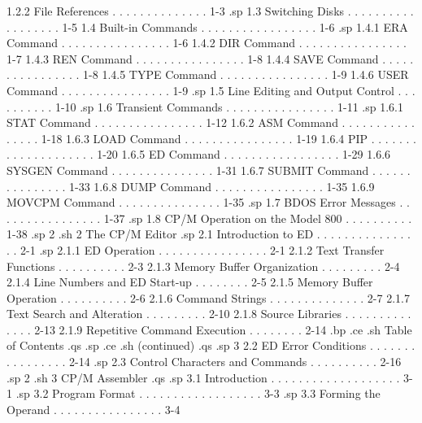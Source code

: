         1.2.2  File References  . . . . . . . . . . . . . .   1-3 
.sp
   1.3  Switching Disks . . . . . . . . . . . . . . . . . .   1-5 
   1.4  Built-in Commands . . . . . . . . . . . . . . . . .   1-6 
.sp
        1.4.1  ERA Command  . . . . . . . . . . . . . . . .   1-6 
        1.4.2  DIR Command  . . . . . . . . . . . . . . . .   1-7 
        1.4.3  REN Command  . . . . . . . . . . . . . . . .   1-8 
        1.4.4  SAVE Command . . . . . . . . . . . . . . . .   1-8 
        1.4.5  TYPE Command . . . . . . . . . . . . . . . .   1-9 
        1.4.6  USER Command . . . . . . . . . . . . . . . .   1-9 
.sp
   1.5  Line Editing and Output Control . . . . . . . . . .  1-10 
.sp
   1.6  Transient Commands  . . . . . . . . . . . . . . . .  1-11 
.sp
        1.6.1  STAT Command . . . . . . . . . . . . . . . .  1-12 
        1.6.2  ASM Command  . . . . . . . . . . . . . . . .  1-18 
        1.6.3  LOAD Command . . . . . . . . . . . . . . . .  1-19 
        1.6.4  PIP  . . . . . . . . . . . . . . . . . . . .  1-20 
        1.6.5  ED Command . . . . . . . . . . . . . . . . .  1-29 
        1.6.6  SYSGEN Command . . . . . . . . . . . . . . .  1-31 
        1.6.7  SUBMIT Command . . . . . . . . . . . . . . .  1-33 
        1.6.8  DUMP Command . . . . . . . . . . . . . . . .  1-35 
        1.6.9  MOVCPM Command . . . . . . . . . . . . . . .  1-35 
.sp
   1.7  BDOS Error Messages . . . . . . . . . . . . . . . .  1-37 
.sp
   1.8  CP/M Operation on the Model 800 . . . . . . . . . .  1-38 
.sp 2
.sh
2  The CP/M Editor  
.sp
   2.1  Introduction to ED  . . . . . . . . . . . . . . . .   2-1 
.sp
        2.1.1  ED Operation . . . . . . . . . . . . . . . .   2-1 
        2.1.2  Text Transfer Functions  . . . . . . . . . .   2-3 
        2.1.3  Memory Buffer Organization . . . . . . . . .   2-4 
        2.1.4  Line Numbers and ED Start-up . . . . . . . .   2-5 
        2.1.5  Memory Buffer Operation  . . . . . . . . . .   2-6 
        2.1.6  Command Strings  . . . . . . . . . . . . . .   2-7 
        2.1.7  Text Search and Alteration . . . . . . . . .  2-10 
        2.1.8  Source Libraries . . . . . . . . . . . . . .  2-13 
        2.1.9  Repetitive Command Execution . . . . . . . .  2-14 
.bp
.ce
.sh
Table of Contents 
.qs
.sp
.ce
.sh
(continued)
.qs
.sp 3
   2.2  ED Error Conditions . . . . . . . . . . . . . . . .  2-14 
.sp
   2.3  Control Characters and Commands . . . . . . . . . .  2-16 
.sp 2
.sh
3  CP/M Assembler 
.qs
.sp
   3.1  Introduction  . . . . . . . . . . . . . . . . . . .   3-1 
.sp
   3.2  Program Format  . . . . . . . . . . . . . . . . . .   3-3 
.sp
   3.3  Forming the Operand . . . . . . . . . . . . . . . .   3-4 
